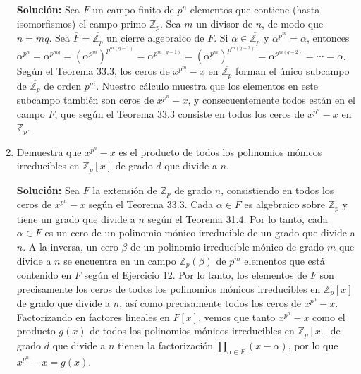 \begin{enumerate}
    \textbf{Solución:} Sea $F$ un campo finito de $p^n$ elementos que contiene (hasta isomorfismos) el campo primo $\mathbb{Z}_p$. Sea $m$ un divisor de $n$, de modo que $n = mq$. Sea $\overline{F} = \overline{\mathbb{Z}_p}$ un cierre algebraico de $F$. Si $\alpha \in \overline{\mathbb{Z}_p}$ y $\alpha^{p^m} = \alpha$, entonces $\alpha^{p^n} = \alpha^{p^{mq}} = (\alpha^{p^m})^{p^{m(q-1)}} = \alpha^{p^{m(q-1)}} = (\alpha^{p^{m}})^{p^{m(q-2)}} = \alpha^{p^{m(q-2)}} = \cdots= \alpha$. Según el Teorema 33.3, los ceros de $x^{p^m} - x$ en $\overline{\mathbb{Z}_p}$ forman el único subcampo de $\overline{\mathbb{Z}_p}$ de orden $p^m$. Nuestro cálculo muestra que los elementos en este subcampo también son ceros de $x^{p^n} - x$, y consecuentemente todos están en el campo $F$, que según el Teorema 33.3 consiste en todos los ceros de $x^{p^n} - x$ en $\overline{\mathbb{Z}_p}$.

    \item Demuestra que $x^{p^n} - x$ es el producto de todos los polinomios mónicos irreducibles en $\mathbb{Z}_p[x]$ de grado $d$ que divide a $n$.
    
    \textbf{Solución:} Sea $F$ la extensión de $\mathbb{Z}_p$ de grado $n$, consistiendo en todos los ceros de $x^{p^n} - x$ según el Teorema 33.3. Cada $\alpha \in F$ es algebraico sobre $\mathbb{Z}_p$ y tiene un grado que divide a $n$ según el Teorema 31.4. Por lo tanto, cada $\alpha \in F$ es un cero de un polinomio mónico irreducible de un grado que divide a $n$. A la inversa, un cero $\beta$ de un polinomio irreducible mónico de grado $m$ que divide a $n$ se encuentra en un campo $\mathbb{Z}_p(\beta)$ de $p^m$ elementos que está contenido en $F$ según el Ejercicio 12. Por lo tanto, los elementos de $F$ son precisamente los ceros de todos los polinomios mónicos irreducibles en $\mathbb{Z}_p[x]$ de grado que divide a $n$, así como precisamente todos los ceros de $x^{p^n} - x$. Factorizando en factores lineales en $F[x]$, vemos que tanto $x^{p^n} - x$ como el producto $g(x)$ de todos los polinomios mónicos irreducibles en $\mathbb{Z}_p[x]$ de grado $d$ que divide a $n$ tienen la factorización $\prod_{\alpha \in F} (x - \alpha)$, por lo que $x^{p^n} - x = g(x)$.
\end{enumerate}